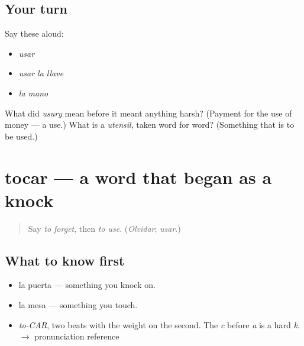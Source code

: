 \subsection*{Your turn}
Say these aloud:

\begin{itemize}
\raggedright
  \item \emph{usar}
  \item \emph{usar la llave}
  \item \emph{la mano}
\end{itemize}

\begin{tcolorbox}[breakable,colback=teal!4,colframe=teal!35!black,title={Before you move on}]
What did \emph{usury} mean before it meant anything harsh? (Payment for the use of money — a use.) What is a \emph{utensil}, taken word for word? (Something that is to be used.)
\end{tcolorbox}
\section[tocar]{tocar — a word that began as a knock}

\label{lesson:ES-C385-tocar}



\begin{quote}
Say \emph{to forget}, then \emph{to use}. (\emph{Olvidar}; \emph{usar}.)
\end{quote}

\subsection*{What to know first}
\begin{itemize}
\raggedright
  \item la puerta — something you knock on.
  \item la mesa — something you touch.
\end{itemize}

\begin{sounds}
\begin{itemize}
\raggedright
  \item \emph{to-CAR}, two beats with the weight on the second. The \emph{c} before \emph{a} is a hard \emph{k}. $\to$ pronunciation reference
\end{itemize}
\end{sounds}

